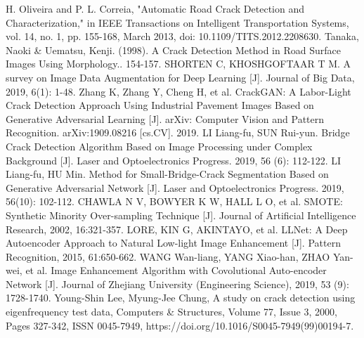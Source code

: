 \documentclass[a4paper,UTF8]{article}
\theoremstyle{definition}
\begin{document}
\begin{thebibliography}{99}
		 H. Oliveira and P. L. Correia, "Automatic Road Crack Detection and Characterization," in IEEE Transactions on Intelligent Transportation Systems, vol. 14, no. 1, pp. 155-168, March 2013, doi: 10.1109/TITS.2012.2208630.
		 Tanaka, Naoki \& Uematsu, Kenji. (1998). A Crack Detection Method in Road Surface Images Using Morphology.. 154-157. 
		 SHORTEN C, KHOSHGOFTAAR T M. A survey on Image Data Augmentation for Deep Learning [J]. Journal of Big Data, 2019, 6(1): 1-48.
		 Zhang K, Zhang Y, Cheng H, et al. CrackGAN: A Labor-Light Crack Detection Approach Using Industrial Pavement Images Based on Generative Adversarial Learning [J]. arXiv: Computer Vision and Pattern Recognition. arXiv:1909.08216 [cs.CV]. 2019.
		 LI Liang-fu, SUN Rui-yun. Bridge Crack Detection Algorithm Based on Image Processing under Complex Background [J]. Laser and Optoelectronics Progress. 2019, 56 (6): 112-122.
		 LI Liang-fu, HU Min. Method for Small-Bridge-Crack Segmentation Based on Generative Adversarial Network [J]. Laser and Optoelectronics Progress. 2019, 56(10): 102-112.
		 CHAWLA N V, BOWYER K W, HALL L O, et al. SMOTE: Synthetic Minority Over-sampling Technique [J]. Journal of Artificial Intelligence Research, 2002, 16:321-357.
		 LORE, KIN G, AKINTAYO, et al. LLNet: A Deep Autoencoder Approach to Natural Low-light Image Enhancement [J]. Pattern Recognition, 2015, 61:650-662.
		 WANG Wan-liang, YANG Xiao-han, ZHAO Yan-wei, et al. Image Enhancement Algorithm with Covolutional Auto-encoder Network [J]. Journal of Zhejiang University (Engineering Science), 2019, 53 (9): 1728-1740.
		 Young-Shin Lee, Myung-Jee Chung, A study on crack detection using eigenfrequency test data, Computers \& Structures, Volume 77, Issue 3, 2000, Pages 327-342, ISSN 0045-7949, https://doi.org/10.1016/S0045-7949(99)00194-7.
	\end{thebibliography}
\end{document}
